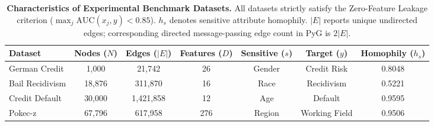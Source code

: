 \begin{table}[t]
\centering
\small
\caption{\textbf{Characteristics of Experimental Benchmark Datasets.} 
All datasets strictly satisfy the Zero-Feature Leakage criterion ($\max_j \text{AUC}(x_j, y) < 0.85$). $h_s$ denotes sensitive attribute homophily. $|E|$ reports unique undirected edges; corresponding directed message-passing edge count in PyG is $2|E|$.}
\label{tab:datasets}
\begin{tabular}{lcccccc}
\toprule
\textbf{Dataset} & \textbf{Nodes ($N$)} & \textbf{Edges ($|E|$)} & \textbf{Features ($D$)} & \textbf{Sensitive ($s$)} & \textbf{Target ($y$)} & \textbf{Homophily ($h_s$)} \\
\midrule
German Credit & 1,000 & 21,742 & 26 & Gender & Credit Risk & 0.8048 \\
Bail Recidivism & 18,876 & 311,870 & 16 & Race & Recidivism & 0.5221 \\
Credit Default & 30,000 & 1,421,858 & 12 & Age & Default & 0.9595 \\
Pokec-z & 67,796 & 617,958 & 276 & Region & Working Field & 0.9506 \\
\bottomrule
\end{tabular}
\end{table}
